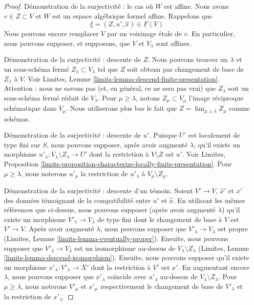 \begin{proof}
\medskip\noindent
Démonstration de la surjectivité : le cas où $W$ est affine. Nous avons $v \in Z \subset V$
et $W$ est un espace algébrique formel affine. Rappelons que
$$
\xi = (Z, u', \hat x) \in F(V)
$$
Nous pouvons encore remplacer $V$ par un voisinage \'etale de $v$.
En particulier, nous pouvons supposer, et supposons, que $V$ et $V_\lambda$ sont affines.

\medskip\noindent
Démonstration de la surjectivité : descente de $Z$. Nous pouvons trouver un $\lambda$
et un sous-schéma fermé $Z_\lambda \subset V_\lambda$ tel que
$Z$ soit obtenu par changement de base de $Z_\lambda$ à $V$. Voir
Limites, Lemme \ref{limits-lemma-descend-finite-presentation}.
Attention : nous ne savons pas (et, en général, ce ne sera pas vrai)
que $Z_\lambda$ soit un sous-schéma fermé réduit de $V_\lambda$.
Pour $\mu \geq \lambda$, notons $Z_\mu \subset V_\mu$ l'image réciproque schématique
dans $V_\mu$. Nous utiliserons plus bas le fait que
$Z = \lim_{\mu \geq \lambda} Z_\mu$ comme schémas.

\medskip\noindent
Démonstration de la surjectivité : descente de $u'$.
Puisque $U'$ est localement de type fini sur $S$,
nous pouvons supposer, après avoir augmenté $\lambda$,
qu'il existe un morphisme
$u'_\lambda : V_\lambda \setminus Z_\lambda \to U'$
dont la restriction à $V \setminus Z$ est $u'$.
Voir Limites, Proposition
\ref{limits-proposition-characterize-locally-finite-presentation}.
Pour $\mu \geq \lambda$, nous noterons $u'_\mu$ la restriction
de $u'_\lambda$ à $V_\mu \setminus Z_\mu$.

\medskip\noindent
Démonstration de la surjectivité : descente d'un témoin.
Soient $V' \to V$, $\hat x'$ et $x'$ des données témoignant de la compatibilité entre
$u'$ et $\hat x$. En utilisant les mêmes références que ci-dessus, nous pouvons supposer
(après avoir augmenté $\lambda$) qu'il existe un morphisme
$V'_\lambda \to V_\lambda$ de type fini dont le changement de base à $V$
est $V' \to V$. Après avoir augmenté $\lambda$, nous pouvons supposer que
$V'_\lambda \to V_\lambda$ est propre
(Limites, Lemme \ref{limits-lemma-eventually-proper}).
Ensuite, nous pouvons supposer que $V'_\lambda \to V_\lambda$ est un isomorphisme
au-dessus de $V_\lambda \setminus Z_\lambda$
(Limites, Lemme \ref{limits-lemma-descend-isomorphism}).
Ensuite, nous pouvons supposer qu'il existe un morphisme $x'_\lambda : V'_\lambda \to X'$
dont la restriction à $V'$ est $x'$.
En augmentant encore $\lambda$, nous pouvons supposer que $x'_\lambda$
coïncide avec $u'_\lambda$ au-dessus de $V_\lambda \setminus Z_\lambda$.
Pour $\mu \geq \lambda$, nous noterons
$V'_\mu$ et $x'_\mu$ respectivement le changement de base de $V'_\lambda$ et la
restriction de $x'_\lambda$.


\end{proof}
